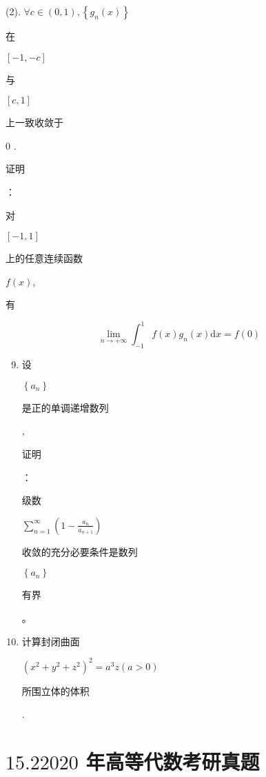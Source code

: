 \documentclass[10pt]{article}
\begin{document}
(2). $\forall c \in(0,1),\left\{g_{n}(x)\right\}$ \begin{CJK}{UTF8}{mj}在\end{CJK} $[-1,-c]$ \begin{CJK}{UTF8}{mj}与\end{CJK} $[c, 1]$ \begin{CJK}{UTF8}{mj}上一致收敛于\end{CJK} 0 .

\begin{CJK}{UTF8}{mj}证明\end{CJK}：\begin{CJK}{UTF8}{mj}对\end{CJK} $[-1,1]$ \begin{CJK}{UTF8}{mj}上的任意连续函数\end{CJK} $f(x)$, \begin{CJK}{UTF8}{mj}有\end{CJK}
$$
\lim _{n \rightarrow+\infty} \int_{-1}^{1} f(x) g_{n}(x) \mathrm{d} x=f(0)
$$

\begin{enumerate}
  \setcounter{enumi}{8}
  \item \begin{CJK}{UTF8}{mj}设\end{CJK} $\left\{a_{n}\right\}$ \begin{CJK}{UTF8}{mj}是正的单调递增数列\end{CJK}, \begin{CJK}{UTF8}{mj}证明\end{CJK}：\begin{CJK}{UTF8}{mj}级数\end{CJK} $\sum_{n=1}^{\infty}\left(1-\frac{a_{n}}{a_{n+1}}\right)$ \begin{CJK}{UTF8}{mj}收敛的充分必要条件是数列\end{CJK} $\left\{a_{n}\right\}$ \begin{CJK}{UTF8}{mj}有界\end{CJK}。

  \item \begin{CJK}{UTF8}{mj}计算封闭曲面\end{CJK} $\left(x^{2}+y^{2}+z^{2}\right)^{2}=a^{3} z(a>0)$ \begin{CJK}{UTF8}{mj}所围立体的体积\end{CJK}.

\end{enumerate}
\section{$15.22020$ 年高等代数考研真题}
\end{document}
